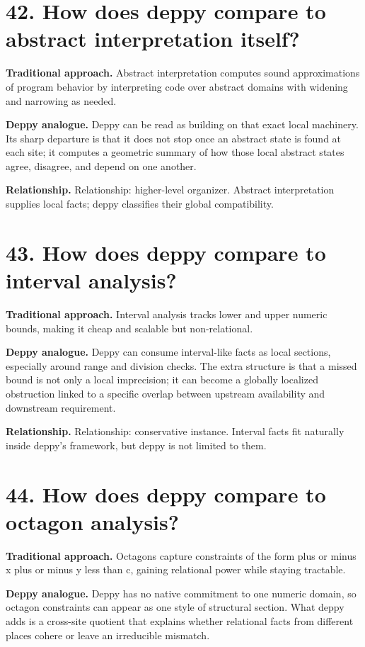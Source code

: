 \documentclass[11pt,openany]{book}
\begin{document}
\section*{42. How does deppy compare to abstract interpretation itself?}
\textbf{Traditional approach.} Abstract interpretation computes sound approximations of program behavior by interpreting code over abstract domains with widening and narrowing as needed.

\textbf{Deppy analogue.} Deppy can be read as building on that exact local machinery. Its sharp departure is that it does not stop once an abstract state is found at each site; it computes a geometric summary of how those local abstract states agree, disagree, and depend on one another.

\textbf{Relationship.} Relationship: higher-level organizer. Abstract interpretation supplies local facts; deppy classifies their global compatibility.

\section*{43. How does deppy compare to interval analysis?}
\textbf{Traditional approach.} Interval analysis tracks lower and upper numeric bounds, making it cheap and scalable but non-relational.

\textbf{Deppy analogue.} Deppy can consume interval-like facts as local sections, especially around range and division checks. The extra structure is that a missed bound is not only a local imprecision; it can become a globally localized obstruction linked to a specific overlap between upstream availability and downstream requirement.

\textbf{Relationship.} Relationship: conservative instance. Interval facts fit naturally inside deppy's framework, but deppy is not limited to them.

\section*{44. How does deppy compare to octagon analysis?}
\textbf{Traditional approach.} Octagons capture constraints of the form plus or minus x plus or minus y less than c, gaining relational power while staying tractable.

\textbf{Deppy analogue.} Deppy has no native commitment to one numeric domain, so octagon constraints can appear as one style of structural section. What deppy adds is a cross-site quotient that explains whether relational facts from different places cohere or leave an irreducible mismatch.
\end{document}
